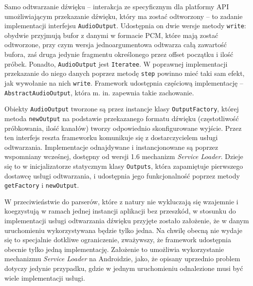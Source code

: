 

Samo odtwarzanie dźwięku -- interakcja ze specyficznym dla platformy API umożliwiającym przekazanie
dźwięku, który ma zostać odtworzony -- to zadanie implementacji interfejsu \texttt{AudioOutput}.
Udostępnia on dwie wersje metody \texttt{write}: obydwie przyjmują bufor z danymi w formacie PCM,
które mają zostać odtworzone, przy czym wersja jednoargumentowa odtwarza całą zawartość bufora, zaś
druga jedynie fragmentu określonego przez offset początku i ilość próbek. Ponadto,
\texttt{AudioOutput} jest \texttt{Iteratee}. W poprawnej implementacji przekazanie do niego danych
poprzez metodę \texttt{step} powinno mieć taki sam efekt, jak wywołanie na nich \texttt{write}.
Framework udostępnia częściową implementację -- \texttt{AbstractAudioOutput}, która m. in. zapewnia
takie zachowanie.

Obiekty \texttt{AudioOutput} tworzone są przez instancje klasy \texttt{OutputFactory}, której metoda
\texttt{newOutput} na podstawie przekazanego formatu dźwięku (częstotliwość próbkowania, ilość
kanałów) tworzy odpowiednio skonfigurowane wyjście. Przez ten interfejs reszta frameworku komunikuje
się z dostarczycielem usługi odtwarzania. Implementacje odnajdywane i instancjonowane są poprzez
wspomniany wcześnej, dostępny od wersji 1.6 mechanizm \emph{Service Loader}. Dzieje się to w
inicjalizatorze statycznym klasy \texttt{Outputs}, która zapamiętuje pierwszego dostawcę usługi
odtwarzania, i udostępnia jego funkcjonalność poprzez metody \texttt{getFactory} i
\texttt{newOutput}.

\begin{Note}
W przeciwieństwie do parserów, które z natury nie wykluczają się wzajemnie i koegzystują w ramach
jednej instancji aplikacji bez przeszkód, w stosunku do implementacji usługi odtwarzania dźwięku
przyjęte zostało założenie, że w danym uruchomieniu wykorzystywana będzie tylko jedna. Na chwilę
obecną nie wydaje się to specjalnie dotkliwe ograniczenie, zważywszy, że framework udostępnia
obecnie tylko jedną implementację. Założenie to umożliwia wykorzystanie mechanizmu \emph{Service
Loader} na Androidzie, jako, że opisany uprzednio problem dotyczy jedynie przypadku, gdzie w jednym
uruchomieniu odnalezione musi być wiele implementacji usługi.  
\end{Note}

